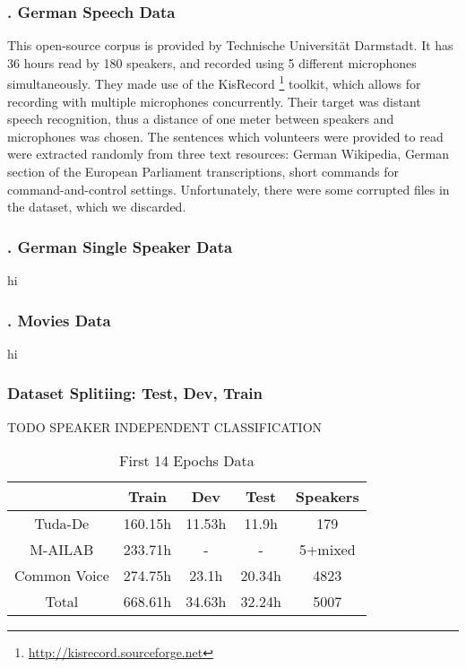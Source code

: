 \subsubsection{. German Speech Data \cite{radeck2015open}}
\label{meth:subsub3}

This open-source corpus is provided by Technische Universit{\"a}t Darmstadt. It has 36 hours read by 180 speakers, and recorded using 5 different microphones simultaneously. They made use of the KisRecord \footnote{\url{http://kisrecord.sourceforge.net}} toolkit, which allows for recording with multiple microphones concurrently. Their target was distant speech recognition, thus a distance of one meter between speakers and microphones was chosen. The sentences which volunteers were provided to read were extracted randomly from three text resources: German Wikipedia, German section of the European Parliament transcriptions, short commands for command-and-control settings. Unfortunately, there were some corrupted files in the dataset, which we discarded.

\subsubsection{. German Single Speaker Data}
\label{meth:subsub6}
hi

\subsubsection{. Movies Data}
\label{meth:subsub7}
hi

\subsubsection{Dataset Splitiing: Test, Dev, Train}
\label{meth:subsub7}
TODO SPEAKER INDEPENDENT CLASSIFICATION

\begin{table}[!ht]
	\centering
	\begin{tabular}{ | c | c | c | c | c | } 
		\hline
		&   Train   &   Dev &   Test    &   Speakers \\ 
		\hline
		Tuda-De &   160.15h &   11.53h  &   11.9h   &   179 \\
		\hline
		M-AILAB &   233.71h &   -   &   -   &   5+mixed \\ 
		\hline
		Common Voice    &   274.75h &   23.1h   &   20.34h  &   4823 \\
		\hline
		Total   &   668.61h &   34.63h  &   32.24h  &   5007 \\
		\hline
	\end{tabular}
	\caption{First 14 Epochs Data}
	\label{table:data14}
\end{table}

